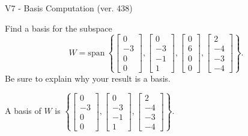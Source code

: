 \begin{exercise}
  \begin{exerciseTitle}V7 - Basis Computation (ver. 438)\end{exerciseTitle}
  \begin{exerciseStatement}
    Find a basis for the subspace 
\[W=\mathrm{span}\ \left\{\left[\begin{array}{r}
0 \\
-3 \\
0 \\
0
\end{array}\right] , \left[\begin{array}{r}
0 \\
-3 \\
-1 \\
1
\end{array}\right] , \left[\begin{array}{r}
0 \\
6 \\
0 \\
0
\end{array}\right] , \left[\begin{array}{r}
2 \\
-4 \\
-3 \\
-4
\end{array}\right]\right\}.\]
 Be sure to explain why your result is a basis.


  \end{exerciseStatement}
  \begin{exerciseAnswer}
   A basis of \(W\) is  \(\left\{\left[\begin{array}{r}
0 \\
-3 \\
0 \\
0
\end{array}\right] , \left[\begin{array}{r}
0 \\
-3 \\
-1 \\
1
\end{array}\right] , \left[\begin{array}{r}
2 \\
-4 \\
-3 \\
-4
\end{array}\right]\right\}\).
  


  \end{exerciseAnswer}
\end{exercise}